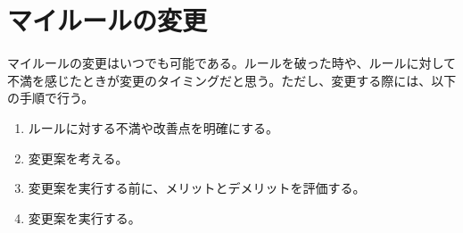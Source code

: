 \documentclass[dvipdfmx]{jlreq}
\begin{document}
\section{マイルールの変更}
    マイルールの変更はいつでも可能である。ルールを破った時や、ルールに対して不満を感じたときが変更のタイミングだと思う。ただし、変更する際には、以下の手順で行う。
    \begin{enumerate}
        \item ルールに対する不満や改善点を明確にする。
        \item 変更案を考える。
        \item 変更案を実行する前に、メリットとデメリットを評価する。
        \item 変更案を実行する。
    \end{enumerate}
\end{document}
